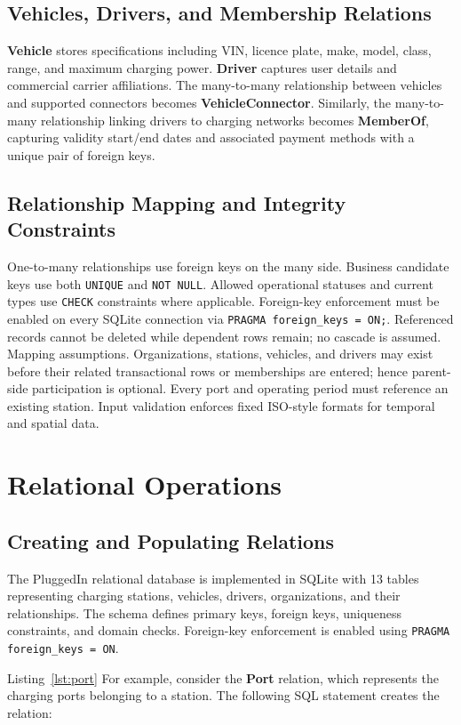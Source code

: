 \documentclass[sigconf,screen,nonacm]{acmart}
\begin{document}
\subsection{Vehicles, Drivers, and Membership Relations}
\textbf{Vehicle} stores specifications including VIN, licence plate, make, model, class, range, and maximum charging power. \textbf{Driver} captures user details and commercial carrier affiliations. The many-to-many relationship between vehicles and supported connectors becomes \textbf{VehicleConnector}. Similarly, the many-to-many relationship linking drivers to charging networks becomes \textbf{MemberOf}, capturing validity start/end dates and associated payment methods with a unique pair of foreign keys.

\subsection{Relationship Mapping and Integrity Constraints}
One-to-many relationships use foreign keys on the many side. Business candidate keys use both \texttt{UNIQUE} and \texttt{NOT NULL}. Allowed operational statuses and current types use \texttt{CHECK} constraints where applicable. Foreign-key enforcement must be enabled on every SQLite connection via \texttt{PRAGMA foreign\_keys = ON;}. Referenced records cannot be deleted while dependent rows remain; no cascade is assumed. 
Mapping assumptions. Organizations, stations, vehicles, and drivers may exist before their related transactional rows or memberships are entered; hence parent-side participation is optional. Every port and operating period must reference an existing station. Input validation enforces fixed ISO-style formats for temporal and spatial data.

\section{Relational Operations}
\subsection{Creating and Populating Relations}
The PluggedIn relational database is implemented in SQLite with 13 tables representing charging stations, vehicles, drivers, organizations, and their relationships. The schema defines primary keys, foreign keys, uniqueness constraints, and domain checks. Foreign-key enforcement is enabled using \texttt{PRAGMA foreign\_keys = ON}.

Listing~\ref{lst:port} For example, consider the \textbf{Port} relation, which represents the charging ports belonging to a station. The following SQL statement creates the relation:
\end{document}
